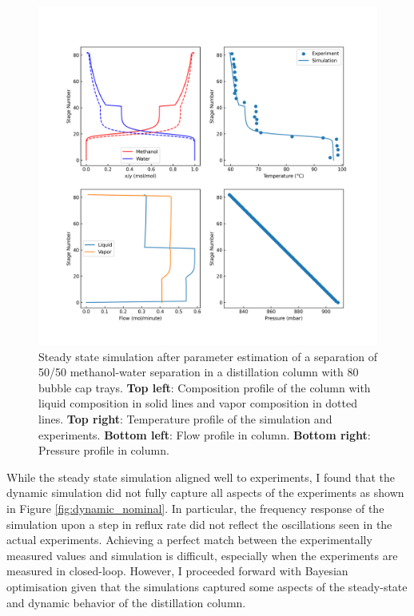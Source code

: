 \begin{figure}
    \centering
    \includegraphics[width=\textwidth]{gfx/Chapter06/2021_11_17_steady_state_estimated.png}
    \caption{Steady state simulation after parameter estimation of a separation of 50/50 methanol-water separation in a distillation column with 80 bubble cap trays. \textbf{Top left}: Composition profile of the column with liquid composition in solid lines and vapor composition in dotted lines. \textbf{Top right}: Temperature profile of the simulation and experiments. \textbf{Bottom left}: Flow profile in column. \textbf{Bottom right}: Pressure profile in column.}
    \label{fig:estimated}
\end{figure}

While the steady state simulation aligned well to experiments, I found that the dynamic simulation did not fully capture all aspects of the experiments as shown in Figure \ref{fig:dynamic_nominal}. In particular, the frequency response of the simulation upon a step in reflux rate did not reflect the oscillations seen in the actual experiments. Achieving a perfect match between the experimentally measured values and simulation is difficult, especially when the experiments are measured in closed-loop. However, I proceeded forward with Bayesian optimisation given that the simulations captured some aspects of the steady-state and dynamic behavior of the distillation column.
 
